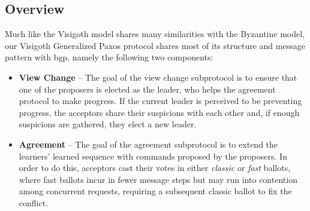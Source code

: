 \subsection{Overview}
Much like the Visigoth model shares many similarities with the Byzantine model, our Visigoth Generalized Paxos protocol shares most of its structure and message pattern with \acrshort{bgp}, namely the following two components:
\begin{itemize}
	\item 
	\textbf{View Change} -- The goal of the view change subprotocol is to ensure that one of the proposers is elected as the leader, who helps the agreement protocol to make progress. If the current leader is perceived to be preventing progress, the acceptors share their suspicions with each other and, if enough suspicions are gathered, they elect a new leader. 
	
	\item 
	\textbf{Agreement} -- The goal of the agreement subprotocol is to extend the learners' learned sequence with commands proposed by the proposers. In order to do this, acceptors cast their votes in either \textit{classic} or \textit{fast} ballots, where fast ballots incur in fewer message steps but may run into contention among concurrent requests, requiring a subsequent classic ballot to fix the conflict.
\end{itemize}


